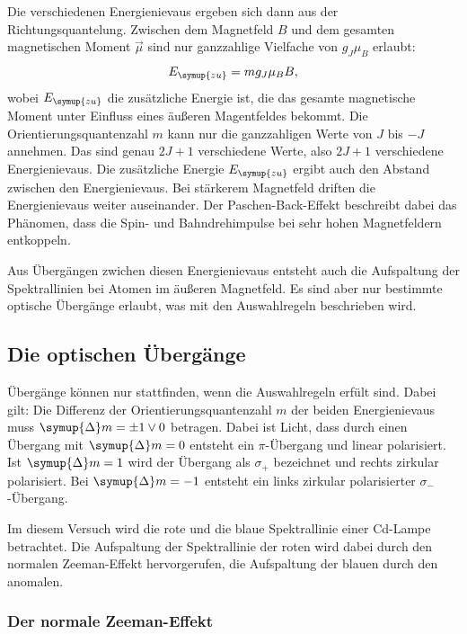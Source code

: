 Die verschiedenen Energienievaus ergeben sich dann aus der Richtungsquantelung. Zwischen dem Magnetfeld $B$ 
und dem gesamten magnetischen Moment $\vec{\mu}$ sind nur ganzzahlige Vielfache von $g_J \mu_B$ erlaubt:
\begin{equation*}
    E_{\symup{zu}} = m g_J \mu_B B,
\end{equation*}
wobei $E_{\symup{zu}}$ die zusätzliche Energie ist, die das gesamte magnetische Moment unter Einfluss 
eines äußeren Magentfeldes bekommt. Die Orientierungsquantenzahl $m$ kann nur die ganzzahligen 
Werte von $J$ bis $-J$ annehmen. Das sind genau $2J+1$ verschiedene Werte, also $2J+1$ verschiedene 
Energienievaus.
Die zusätzliche Energie $E_{\symup{zu}}$ ergibt auch den Abstand zwischen den Energienievaus. Bei stärkerem 
Magnetfeld driften die Energienievaus weiter auseinander. Der Paschen-Back-Effekt beschreibt dabei das 
Phänomen, dass die Spin- und Bahndrehimpulse bei sehr hohen Magnetfeldern entkoppeln.

Aus Übergängen zwichen diesen Energienievaus entsteht auch die Aufspaltung der Spektrallinien bei 
Atomen im äußeren Magnetfeld. Es sind aber nur bestimmte optische Übergänge erlaubt, was mit den 
Auswahlregeln beschrieben wird. 


\subsection{Die optischen Übergänge}

Übergänge können nur stattfinden, wenn die Auswahlregeln erfült sind. Dabei gilt: 
Die Differenz der Orientierungsquantenzahl $m$ der beiden Energienievaus muss $\symup{\Delta}m = \pm 1 \vee 0$ 
betragen. Dabei ist Licht, dass durch einen Übergang mit $\symup{\Delta}m=0$ entsteht ein $\pi$-Übergang 
und linear polarisiert. %
Ist $\symup{\Delta}m = 1$ wird der Übergang als $\sigma_{+}$ bezeichnet und rechts 
zirkular polarisiert. Bei $\symup{\Delta}m = -1$ entsteht ein links zirkular polarisierter $\sigma_{-}$-Übergang.

Im diesem Versuch wird die rote und die blaue Spektrallinie einer Cd-Lampe betrachtet. 
Die Aufspaltung der Spektrallinie der roten wird dabei durch den normalen Zeeman-Effekt hervorgerufen, 
die Aufspaltung der blauen durch den anomalen. 

\subsubsection{Der normale Zeeman-Effekt}

